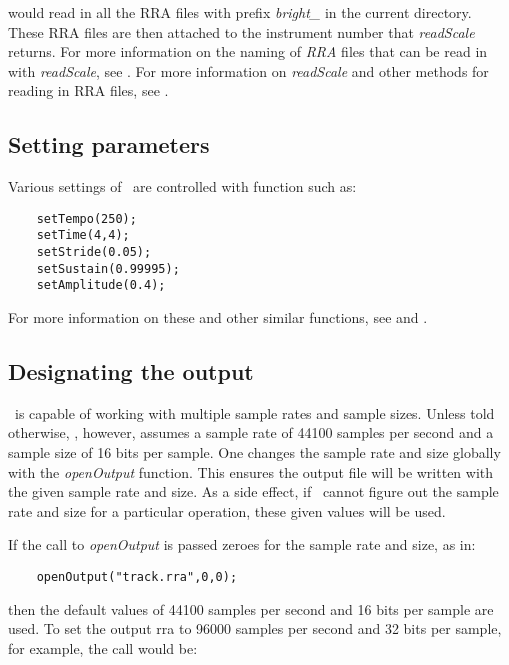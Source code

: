 \documentclass{article}
\begin{document}
would read in all the {\sc RRA} files with prefix {\it bright\_} in the
current directory. These RRA files are then attached to the instrument
number that {\it readScale} returns.
For more information on the naming of {\it RRA} files that can be
read in with {\it readScale},
see .
For more information on {\it readScale} and other methods for reading 
in {\sc RRA} files, 
see .

\subsection*{Setting parameters}

Various settings of \songlib\ are controlled with function such as:

\begin{verbatim}
    setTempo(250);
    setTime(4,4);
    setStride(0.05);
    setSustain(0.99995);
    setAmplitude(0.4);
\end{verbatim}

For more information on these and other similar functions,
see 
and .

\subsection*{Designating the output}

\Songlib\ is capable of working with multiple sample rates and sample
sizes. Unless told otherwise, \songlib, however, assumes a sample rate
of 44100 samples per second and a sample size of 16 bits per sample.
One changes the sample rate and size globally with the {\it openOutput}
function. This ensures the output file will be written with the
given sample rate and size. As a side effect, if \songlib\ cannot
figure out the sample rate and size for a particular operation,
these given values will be used.

If the call to {\it openOutput} is passed zeroes for the sample rate and
size, as in:

\begin{verbatim}
    openOutput("track.rra",0,0);
\end{verbatim}

then the default values of 44100 samples per second and 16 bits per
sample are used. To set the output rra to 96000 samples per second
and 32 bits per sample, for example, the call would be:
\end{document}

